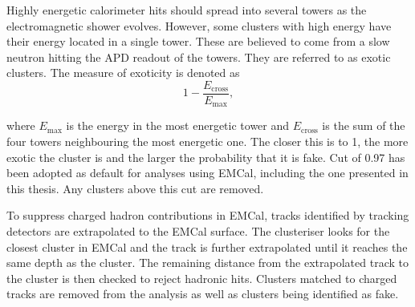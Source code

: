 Highly energetic calorimeter hits should spread into several towers as the electromagnetic shower evolves. However, some clusters with high energy have their energy located in a single tower. These are believed to come from a slow neutron hitting the APD readout of the towers. They are referred to as exotic clusters. The measure of exoticity is denoted as 
\begin{equation}
1 -\frac{E_\mathrm{cross}}{E_\mathrm{max}},
\end{equation}

\noindent where $E_\mathrm{max}$ is the energy in the most energetic tower and $E_\mathrm{cross}$ is the sum of the four towers neighbouring the most energetic one. The closer this is to 1, the more exotic the cluster is and the larger the probability that it is fake. Cut of 0.97 has been adopted as default for analyses using EMCal, including the one presented in this thesis. Any clusters above this cut are removed.

To suppress charged hadron contributions in EMCal, tracks identified by tracking detectors are extrapolated to the EMCal surface. The clusteriser looks for the closest cluster in EMCal and the track is further extrapolated until it reaches the same depth as the cluster. The remaining distance from the extrapolated track to the cluster is then checked to reject hadronic hits. Clusters matched to charged tracks are removed from the analysis as well as clusters being identified as fake. 










